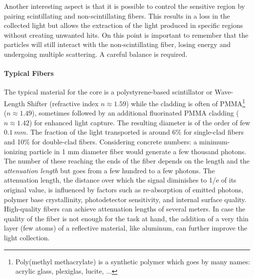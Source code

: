 \begin{refsection}
        \noindent
        Another interesting aspect is that it is possible to control the sensitive region by pairing scintillating and non-scintillating fibers. 
        This results in a loss in the collected light but allows the extraction of the light produced in specific regions without creating unwanted hits.
        On this point is important to remember that the particles will still interact with the non-scintillating fiber, losing energy and undergoing multiple scattering.
        A careful balance is required.

        \paragraph{Typical Fibers}
        The typical material for the core is a polystyrene-based scintillator or Wave-Length Shifter (refractive index $n\approx1.59$) while the cladding is often of PMMA\footnote{Poly(methyl methacrylate) is a synthetic polymer which goes by many names: acrylic glass, plexiglas, lucite, ...} ($n\approx1.49$), sometimes followed by an additional fluorinated PMMA cladding ($n\approx1.42$) for enhanced light capture. 
        The resulting diameter is of the order of few $\SI{0.1}{mm}$.
        The fraction of the light transported is around 6\% for single-clad fibers and 10\% for double-clad fibers. 
        Considering concrete numbers: a minimum-ionizing particle in 1 mm diameter fiber would generate a few thousand photons.
        The number of these reaching the ends of the fiber depends on the length and the \textit{attenuation length} but goes from a few hundred to a few photons.
        The attenuation length, the distance over which the signal diminishes to 1/e of its original value, is influenced by factors such as re-absorption of emitted photons, polymer base crystallinity, photodetector sensitivity, and internal surface quality. 
        High-quality fibers can achieve attenuation lengths of several meters.
        In case the quality of the fiber is not enough for the task at hand, the addition of a very thin layer (few atoms) of a reflective material, like aluminum, can further improve the light collection. 


\end{refsection}
